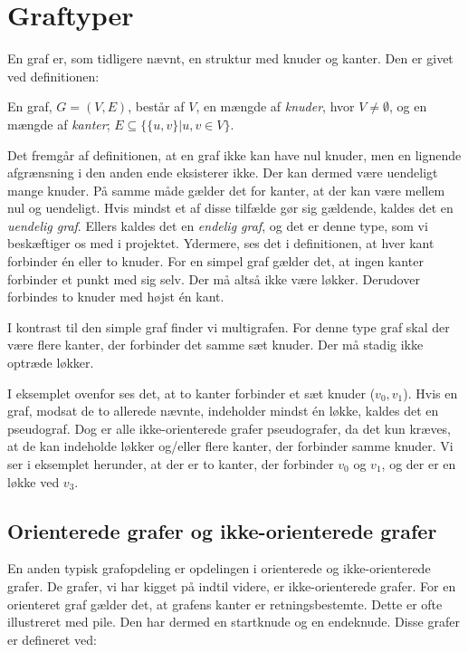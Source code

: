 \section{Graftyper}
En graf er, som tidligere nævnt, en struktur med knuder og kanter. Den er givet ved definitionen:
\begin{defn}
[Graf] 
En graf, $G=(V,E)$, består af $V$, en mængde af \emph{knuder}, hvor $V\neq\emptyset$, og en mængde af \emph{kanter}; $E \subseteq \{\{u,v\}|u,v \in V\}$.
\end{defn}
Det fremgår af definitionen, at en graf ikke kan have nul knuder, men en lignende afgrænsning i den anden ende eksisterer ikke. Der kan dermed være uendeligt mange knuder. På samme måde gælder det for kanter, at der kan være mellem nul og uendeligt. Hvis mindst et af disse tilfælde gør sig gældende, kaldes det en \emph{uendelig graf}. Ellers kaldes det en \emph{endelig graf}, og det er denne type, som vi beskæftiger os med i projektet.
Ydermere, ses det i definitionen, at hver kant forbinder én eller to knuder. For en simpel graf gælder det, at ingen kanter forbinder et punkt med sig selv. Der må altså ikke være løkker. Derudover forbindes to knuder med højst én kant.



I kontrast til den simple graf finder vi multigrafen. For denne type graf skal der være flere kanter, der forbinder det samme sæt knuder. Der må stadig ikke optræde løkker.



I eksemplet ovenfor ses det, at to kanter forbinder et sæt knuder ($v_{0},v_{1}$). Hvis en graf, modsat de to allerede nævnte, indeholder mindst én løkke, kaldes det en pseudograf. Dog er alle ikke-orienterede grafer pseudografer, da det kun kræves, at de kan indeholde løkker og/eller flere kanter, der forbinder samme knuder. Vi ser i eksemplet herunder, at der er to kanter, der forbinder $v_{0}$ og $v_{1}$, og der er en løkke ved $v_{3}$.




\subsection{Orienterede grafer og ikke-orienterede grafer}
En anden typisk grafopdeling er opdelingen i orienterede og ikke-orienterede grafer. De grafer, vi har kigget på indtil videre, er ikke-orienterede grafer. For en orienteret graf gælder det, at grafens kanter er retningsbestemte. Dette er ofte illustreret med pile. Den har dermed en startknude og en endeknude. Disse grafer er defineret ved:

